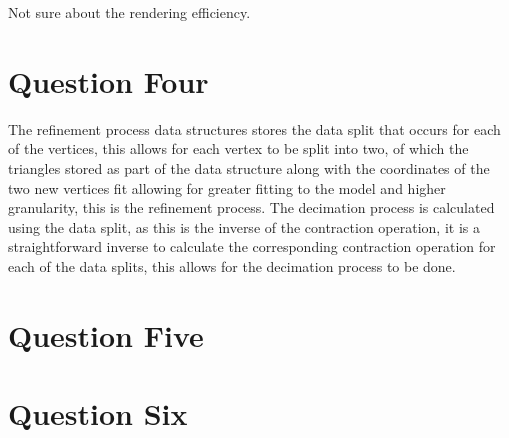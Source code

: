 \documentclass[paper=a4, fontsize=11pt]{scrartcl}
\numberwithin{equation}{section}		%
\numberwithin{figure}{section}			%
\numberwithin{table}{section}				%
\begin{document}
Not sure about the rendering efficiency.

\section*{Question Four}

\iffalse
10 marks \\
100 marks \\
Explain how progressive meshes implement the refinement and decimation processes. \\
\fi

The refinement process data structures stores the data split that occurs for each of the vertices, this allows for each vertex to be split into two, of which the triangles stored as part of the data structure along with the coordinates of the two new vertices fit allowing for greater fitting to the model and higher granularity, this is the refinement process. The decimation process is calculated using the data split, as this is the inverse of the contraction operation, it is a straightforward inverse to calculate the corresponding contraction operation for each of the data splits, this allows for the decimation process to be done.

\section*{Question Five}

\iffalse
20 marks \\
200 words \\
Analyse how the incorporation of level-of-detail modeling impacts the rendering performance
and network bandwidth consumption of a large distributed virtual environment system.
Evaluate the suitability of using progressive meshes to implement the level-of-detail modeling
in such a system. \\
Note that in the above distributed virtual environment system, all graphics models of the virtual
environment are maintained by a remote server. During runtime, each client will download
relevant graphics models on-demand from the server to support interaction and visualisation. \\
\fi



\section*{Question Six}

\iffalse
20 marks \\
200 words \\
Explain the main issue of applying level-of-detail modeling to support interactive visualisation
of a large 3D scene, given that the user is allowed to change the viewpoint from time to time.
Describe two different methods to tackle such a challenge. \\
\fi
\end{document}
